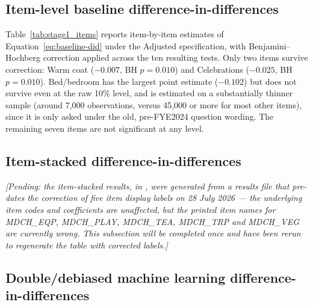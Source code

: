 

\subsection{Item-level baseline difference-in-differences}
\label{sec:res-items}

Table~\ref{tab:stage1_items} reports item-by-item estimates of Equation~\ref{eq:baseline-did} under the Adjusted specification, with Benjamini--Hochberg correction applied across the ten resulting tests. Only two items survive correction: Warm coat ($-0.007$, BH $p=0.010$) and Celebrations ($-0.025$, BH $p=0.010$). Bed/bedroom has the largest point estimate ($-0.102$) but does not survive even at the raw 10\% level, and is estimated on a substantially thinner sample (around 7,000 observations, versus 45,000 or more for most other items), since it is only asked under the old, pre-FYE2024 question wording. The remaining seven items are not significant at any level.



\subsection{Item-stacked difference-in-differences}
\label{sec:res-stacked}

\emph{[Pending: the item-stacked results, in , were generated from a results file that pre-dates the correction of five item display labels on 28 July 2026 --- the underlying item codes and coefficients are unaffected, but the printed item names for MDCH\_EQP, MDCH\_PLAY, MDCH\_TEA, MDCH\_TRP and MDCH\_VEG are currently wrong. This subsection will be completed once  and  have been rerun to regenerate the table with corrected labels.]}

\subsection{Double/debiased machine learning difference-in-differences}
\label{sec:res-dml}

